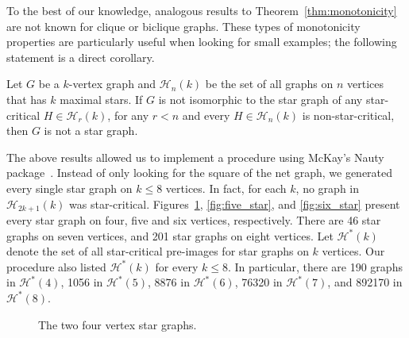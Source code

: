 To the best of our knowledge, analogous results to Theorem~\ref{thm:monotonicity} are not known for clique or biclique graphs.
These types of monotonicity properties are particularly useful when looking for small examples; the following statement is a direct corollary.

\begin{corollary}
    Let $G$ be a $k$-vertex graph and $\mathcal{H}_n(k)$ be the set of all graphs on $n$ vertices that has $k$ maximal stars.
    If $G$ is not isomorphic to the star graph of any star-critical $H \in \mathcal{H}_r(k)$, for any $r < n$ and every $H \in \mathcal{H}_n(k)$ is non-star-critical, then $G$ is not a star graph.
\end{corollary}

The above results allowed us to implement a procedure using McKay's Nauty package~\cite{nauty}.
Instead of only looking for the square of the net graph, we generated every single star graph on $k \leq 8$ vertices.
In fact, for each $k$, no graph in $\mathcal{H}_{2k+1}(k)$ was star-critical.
Figures~\ref{fig:four_star}, \ref{fig:five_star}, and \ref{fig:six_star} present every star graph on four, five and six vertices, respectively.
There are 46 star graphs on seven vertices, and 201 star graphs on eight vertices.
Let $\mathcal{H}^*(k)$ denote the set of all star-critical pre-images for star graphs on $k$ vertices.
Our procedure also listed $\mathcal{H}^*(k)$ for every $k \leq 8$.
In particular, there are 190 graphs in $\mathcal{H}^*(4)$, 1056 in $\mathcal{H}^*(5)$, 8876 in $\mathcal{H}^*(6)$, 76320 in $\mathcal{H}^*(7)$, and 892170 in $\mathcal{H}^*(8)$.

\begin{figure}
    \centering
    \begin{subfigure}{.5\textwidth}
      \centering
      
    \end{subfigure}%
    \begin{subfigure}{.5\textwidth}
      \centering
      
    \end{subfigure}
    \caption{The two four vertex star graphs. \label{fig:four_star}}
\end{figure}


